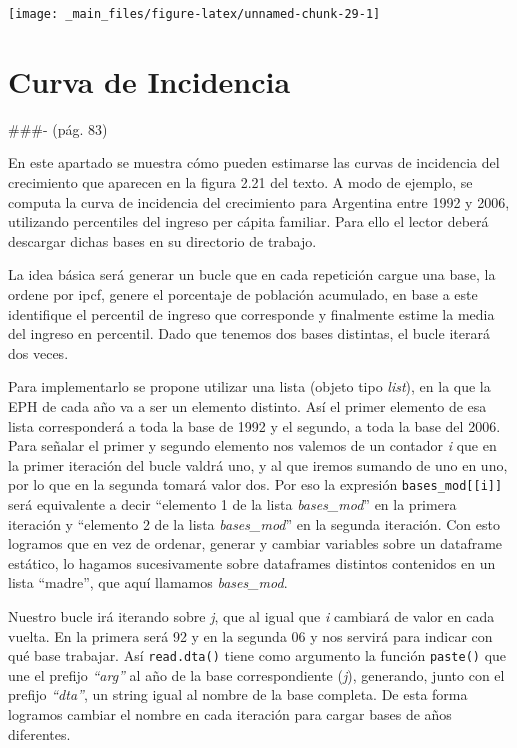 \documentclass[
]{book}
\begin{document}
\texttt{[image: \_main\_files/figure-latex/unnamed-chunk-29-1]}

\hypertarget{cap-2.8}{%
\section{Curva de Incidencia}\label{cap-2.8}}

\#\#\#- (pág. 83)

En este apartado se muestra cómo pueden estimarse las curvas de incidencia del crecimiento que aparecen en la figura 2.21 del texto. A modo de ejemplo, se computa la curva de incidencia del crecimiento para Argentina entre 1992 y 2006, utilizando percentiles del ingreso per cápita familiar. Para ello el lector deberá descargar dichas bases en su directorio de trabajo.

La idea básica será generar un bucle que en cada repetición cargue una base, la ordene por ipcf, genere el porcentaje de población acumulado, en base a este identifique el percentil de ingreso que corresponde y finalmente estime la media del ingreso en percentil. Dado que tenemos dos bases distintas, el bucle iterará dos veces.

Para implementarlo se propone utilizar una lista (objeto tipo \emph{list}), en la que la EPH de cada año va a ser un elemento distinto. Así el primer elemento de esa lista corresponderá a toda la base de 1992 y el segundo, a toda la base del 2006. Para señalar el primer y segundo elemento nos valemos de un contador \emph{i} que en la primer iteración del bucle valdrá uno, y al que iremos sumando de uno en uno, por lo que en la segunda tomará valor dos. Por eso la expresión \texttt{bases\_mod{[}{[}i{]}{]}} será equivalente a decir ``elemento 1 de la lista \emph{bases\_mod}'' en la primera iteración y ``elemento 2 de la lista \emph{bases\_mod}'' en la segunda iteración. Con esto logramos que en vez de ordenar, generar y cambiar variables sobre un dataframe estático, lo hagamos sucesivamente sobre dataframes distintos contenidos en un lista ``madre'', que aquí llamamos \emph{bases\_mod}.

Nuestro bucle irá iterando sobre \emph{j}, que al igual que \emph{i} cambiará de valor en cada vuelta. En la primera será 92 y en la segunda 06 y nos servirá para indicar con qué base trabajar. Así \texttt{read.dta()} tiene como argumento la función \texttt{paste()} que une el prefijo \emph{``arg''} al año de la base correspondiente (\emph{j}), generando, junto con el prefijo \emph{``dta''}, un string igual al nombre de la base completa. De esta forma logramos cambiar el nombre en cada iteración para cargar bases de años diferentes.
\end{document}
